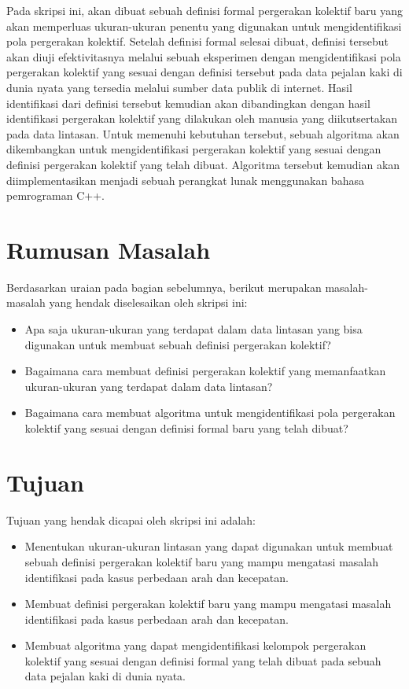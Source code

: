 \documentclass[a4paper,twoside]{article}
\begin{document}
Pada skripsi ini, akan dibuat sebuah definisi formal pergerakan kolektif baru yang akan memperluas ukuran-ukuran penentu yang digunakan untuk mengidentifikasi pola pergerakan kolektif. Setelah definisi formal selesai dibuat, definisi tersebut akan diuji efektivitasnya melalui sebuah eksperimen dengan mengidentifikasi pola pergerakan kolektif yang sesuai dengan definisi tersebut pada data pejalan kaki di dunia nyata yang tersedia melalui sumber data publik di internet. Hasil identifikasi dari definisi tersebut kemudian akan dibandingkan dengan hasil identifikasi pergerakan kolektif yang dilakukan oleh manusia yang diikutsertakan pada data lintasan. Untuk memenuhi kebutuhan tersebut, sebuah algoritma akan dikembangkan untuk mengidentifikasi pergerakan kolektif yang sesuai dengan definisi pergerakan kolektif yang telah dibuat. Algoritma tersebut kemudian akan diimplementasikan menjadi sebuah perangkat lunak menggunakan bahasa pemrograman C++.

\section{Rumusan Masalah}

Berdasarkan uraian pada bagian sebelumnya, berikut merupakan masalah-masalah yang hendak diselesaikan oleh skripsi ini:

\begin{itemize}[noitemsep, nolistsep]
    \item Apa saja ukuran-ukuran yang terdapat dalam data lintasan yang bisa digunakan untuk membuat sebuah definisi pergerakan kolektif?
    \item Bagaimana cara membuat definisi pergerakan kolektif yang memanfaatkan ukuran-ukuran yang terdapat dalam data lintasan?
    \item Bagaimana cara membuat algoritma untuk mengidentifikasi pola pergerakan kolektif yang sesuai dengan definisi formal baru yang telah dibuat?
\end{itemize}

\section{Tujuan}

Tujuan yang hendak dicapai oleh skripsi ini adalah:

\begin{itemize}[noitemsep, nolistsep]
    \item Menentukan ukuran-ukuran lintasan yang dapat digunakan untuk membuat sebuah definisi pergerakan kolektif baru yang mampu mengatasi masalah identifikasi pada kasus perbedaan arah dan kecepatan.
    \item Membuat definisi pergerakan kolektif baru yang mampu mengatasi masalah identifikasi pada kasus perbedaan arah dan kecepatan.
    \item Membuat algoritma yang dapat mengidentifikasi kelompok pergerakan kolektif yang sesuai dengan definisi formal yang telah dibuat pada sebuah data pejalan kaki di dunia nyata.
\end{itemize}
\end{document}
